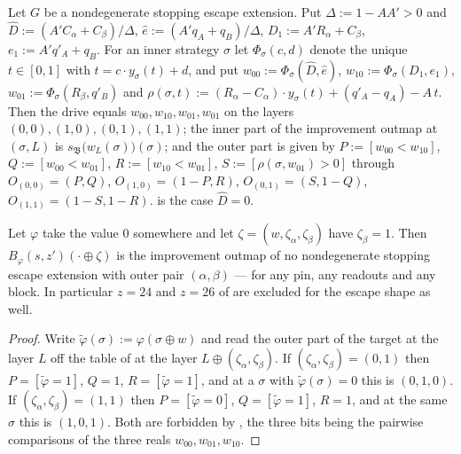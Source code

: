 \begin{theorem}\label{dl:escape-level}
Let $G$ be a nondegenerate stopping escape extension. Put $\Delta:=1-AA'>0$ and
$\widehat D:=(A'C_\alpha+C_\beta)/\Delta$, $\widehat e:=(A'q_A+q_B)/\Delta$,
$D_1:=A'R_\alpha+C_\beta$, $e_1:=A'q'_A+q_B$. For an inner strategy $\sigma$ let
$\Phi_\sigma(c,d)$ denote the unique $t\in[0,1]$ with $t=c\cdot y_\sigma(t)+d$, and put
$w_{00}:=\Phi_\sigma(\widehat D,\widehat e)$, $w_{10}:=\Phi_\sigma(D_1,e_1)$,
$w_{01}:=\Phi_\sigma(R_\beta,q'_B)$ and
$\rho(\sigma,t):=(R_\alpha-C_\alpha)\cdot y_\sigma(t)+(q'_A-q_A)-A\,t$. Then the drive equals
$w_{00},w_{10},w_{01},w_{01}$ on the layers $(0,0),(1,0),(0,1),(1,1)$; the inner part of the
improvement outmap at $(\sigma,L)$ is $s_{\mathfrak B}\bigl(w_L(\sigma)\bigr)(\sigma)$; and the
outer part is given by $P:=[w_{00}<w_{10}]$, $Q:=[w_{00}<w_{01}]$, $R:=[w_{10}<w_{01}]$,
$S:=[\rho(\sigma,w_{01})>0]$ through
$O_{(0,0)}=(P,Q)$, $O_{(1,0)}=(1-P,R)$, $O_{(0,1)}=(S,1-Q)$, $O_{(1,1)}=(1-S,1-R)$.
 is the case $\widehat D=0$.
\end{theorem}

\begin{theorem}\label{dl:no-beta-translate}
Let $\varphi$ take the value $0$ somewhere and let $\zeta=(w,\zeta_\alpha,\zeta_\beta)$ have
$\zeta_\beta=1$. Then $B_\varphi(s,z')(\cdot\oplus\zeta)$ is the improvement outmap of no
nondegenerate stopping escape extension with outer pair $(\alpha,\beta)$ --- for any pin, any
readouts and any block. In particular $z=24$ and $z=26$ of  are
excluded for the escape shape as well.
\end{theorem}

\begin{proof}
Write $\tilde\varphi(\sigma):=\varphi(\sigma\oplus w)$ and read the outer part of the target at
the layer $L$ off the table of  at the layer
$L\oplus(\zeta_\alpha,\zeta_\beta)$. If $(\zeta_\alpha,\zeta_\beta)=(0,1)$ then
$P=[\tilde\varphi=1]$, $Q=1$, $R=[\tilde\varphi=1]$, and at a $\sigma$ with
$\tilde\varphi(\sigma)=0$ this is $(0,1,0)$. If $(\zeta_\alpha,\zeta_\beta)=(1,1)$ then
$P=[\tilde\varphi=0]$, $Q=[\tilde\varphi=1]$, $R=1$, and at the same $\sigma$ this is $(1,0,1)$.
Both are forbidden by , the three bits being the pairwise comparisons of the
three reals $w_{00},w_{01},w_{10}$.
\end{proof}